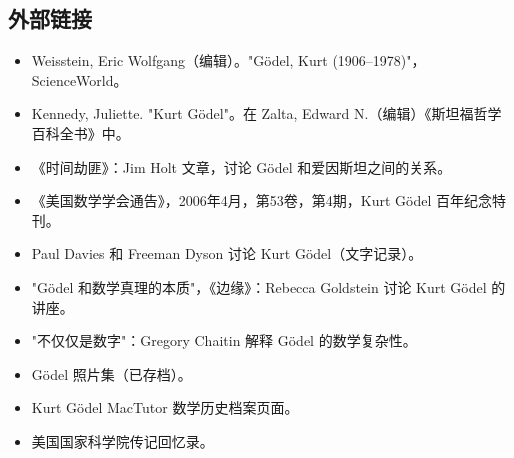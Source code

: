 \subsection{外部链接}
\begin{itemize}
\item Weisstein, Eric Wolfgang（编辑）。"Gödel, Kurt (1906–1978)"，ScienceWorld。
\item Kennedy, Juliette. "Kurt Gödel"。在 Zalta, Edward N.（编辑）《斯坦福哲学百科全书》中。
\item 《时间劫匪》：Jim Holt 文章，讨论 Gödel 和爱因斯坦之间的关系。
\item 《美国数学学会通告》，2006年4月，第53卷，第4期，Kurt Gödel 百年纪念特刊。
\item Paul Davies 和 Freeman Dyson 讨论 Kurt Gödel（文字记录）。
\item "Gödel 和数学真理的本质"，《边缘》：Rebecca Goldstein 讨论 Kurt Gödel 的讲座。
\item "不仅仅是数字"：Gregory Chaitin 解释 Gödel 的数学复杂性。
\item Gödel 照片集（已存档）。
\item Kurt Gödel MacTutor 数学历史档案页面。
\item 美国国家科学院传记回忆录。
\end{itemize}